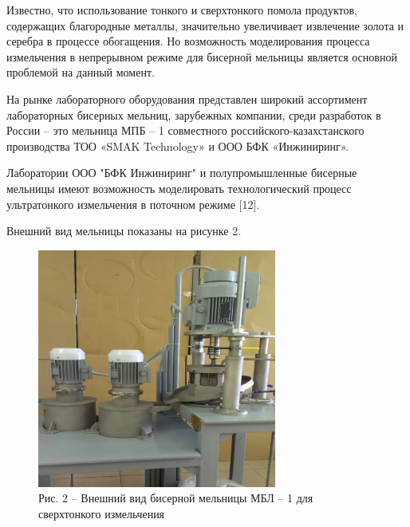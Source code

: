 \begin{multicols}{2}
Известно, что использование тонкого и сверхтонкого помола продуктов,
содержащих благородные металлы, значительно увеличивает извлечение
золота и серебра в процессе обогащения. Но возможность моделирования
процесса измельчения в непрерывном режиме для бисерной мельницы является
основной проблемой на данный момент.

На рынке лабораторного оборудования представлен широкий ассортимент
лабораторных бисерных мельниц, зарубежных компании, среди разработок в
России -- это мельница МПБ -- 1 совместного российского-казахстанского
производства ТОО «SMAK Technology» и ООО БФК «Инжиниринг».

Лаборатории ООО "БФК Инжиниринг" и полупромышленные бисерные мельницы
имеют возможность моделировать технологический процесс ультратонкого
измельчения в поточном режиме {[}12{]}.

Внешний вид мельницы показаны на рисунке 2.
\end{multicols}

\begin{figure}[H]
	\centering
	\includegraphics[width=0.7\textwidth]{assets/300}
	\caption*{Рис. 2 -- Внешний вид бисерной мельницы МБЛ -- 1 для
сверхтонкого измельчения}
\end{figure}


